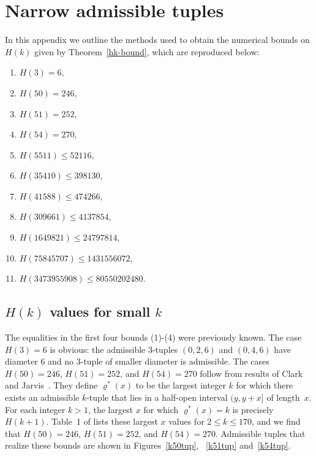 \section{Narrow admissible tuples}\label{tuples-sec}

In this appendix we outline the methods used to obtain the numerical bounds on $H(k)$ given by Theorem~\ref{hk-bound}, which are reproduced below:
\smallskip

\begin{enumerate}
\item $H(3) = 6$,
\item $H(50) = 246$,
\item $H(51) = 252$,
\item $H(54) = 270$,
\item $H(\num{5511}) \leq \num{52116}$,
\item $H(\num{35410}) \leq \num{398130}$,
\item $H(\num{41588}) \leq \num{474266}$,
\item $H(\num{309661}) \leq \num{4137854}$,
\item $H(\num{1649821}) \leq \num{24797814}$,
\item $H(\num{75845707}) \leq \num{1431556072}$,
\item $H(\num{3473955908}) \leq \num{80550202480}$.
\end{enumerate}
\smallskip

\subsection{\texorpdfstring{$H(k)$}{H(k)} values for small \texorpdfstring{$k$}{k}}

The equalities in the first four bounds (1)-(4) were previously known.
The case $H(3)=6$ is obvious: the admissible 3-tuples $(0,2,6)$ and $(0,4,6)$ have diameter $6$ and no $3$-tuple of smaller diameter is admissible.
The cases $H(50)=246$, $H(51)=252$, and $H(54)=270$ follow from results of Clark and Jarvis~\cite{clark}.
They define $\varrho^*(x)$ to be the largest integer $k$ for which there exists an admissible $k$-tuple that lies in a half-open interval $(y,y+x]$ of length~$x$.
For each integer $k>1$, the largest $x$ for which $\varrho^*(x)=k$ is precisely $H(k+1)$.
Table~1 of \cite{clark} lists these largest $x$ values for $2\le k\le 170$, and we find that $H(50)=246$, $H(51)=252$, and $H(54)=270$.
Admissible tuples that realize these bounds are shown in Figures~\ref{k50tup}, ~\ref{k51tup} and~\ref{k54tup}.

